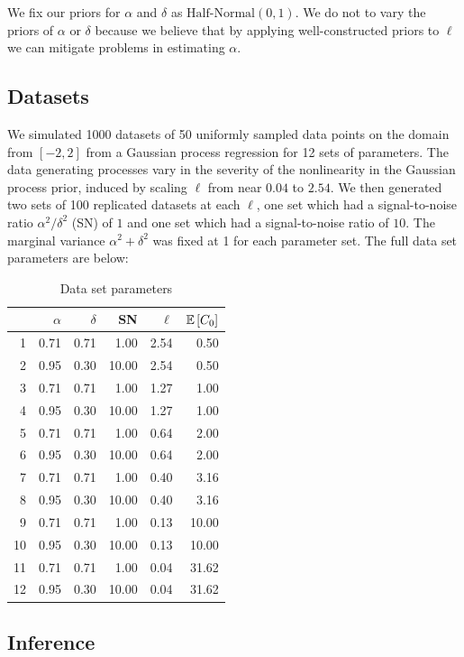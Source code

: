 \documentclass{article}
\newcommand{\Exp}[1]{\ensuremath{\mathbb{E} \lb #1 \rb}}
\newcommand{\lb}{\ensuremath{\left[}}
\newcommand{\rb}{\ensuremath{\right]}}
\begin{document}
We fix our priors for $\alpha$ and $\delta$ as $\text{Half-Normal}(0, 1)$. We
do not to vary the priors of $\alpha$ or $\delta$ because we believe that by
applying well-constructed priors to $\ell$ we can mitigate problems in
estimating $\alpha$. 

\subsection{Datasets}

We simulated 1000 datasets of 50 uniformly sampled data points on the domain
from $[-2, 2]$ from a Gaussian process regression for 12 sets of parameters.
The data generating processes vary in the severity of the nonlinearity in the
Gaussian process prior, induced by scaling $\ell$ from near $0.04$ to $2.54$.
We then generated two sets of 100 replicated datasets at each $\ell$, one set
which had a signal-to-noise ratio $\alpha ^ 2/ \delta ^ 2$ (SN) of $1$ and one
set which had a signal-to-noise ratio of $10$. The marginal variance $\alpha ^
2 + \delta ^ 2$ was fixed at 1 for each parameter set. The full data set
parameters are below:
\begin{table}[ht]
\centering
\caption{Data set parameters}
\begin{tabular}{rrrrrr}
  \hline
  & $\alpha$ & $\delta$ & SN & $\ell$ & $\Exp{C_0}$ \\ 
  \hline
1 & 0.71 & 0.71 & 1.00 & 2.54 & 0.50 \\ 
  2 & 0.95 & 0.30 & 10.00 & 2.54 & 0.50 \\ 
  3 & 0.71 & 0.71 & 1.00 & 1.27 & 1.00 \\ 
  4 & 0.95 & 0.30 & 10.00 & 1.27 & 1.00 \\ 
  5 & 0.71 & 0.71 & 1.00 & 0.64 & 2.00 \\ 
  6 & 0.95 & 0.30 & 10.00 & 0.64 & 2.00 \\ 
  7 & 0.71 & 0.71 & 1.00 & 0.40 & 3.16 \\ 
  8 & 0.95 & 0.30 & 10.00 & 0.40 & 3.16 \\ 
  9 & 0.71 & 0.71 & 1.00 & 0.13 & 10.00 \\ 
  10 & 0.95 & 0.30 & 10.00 & 0.13 & 10.00 \\ 
  11 & 0.71 & 0.71 & 1.00 & 0.04 & 31.62 \\ 
  12 & 0.95 & 0.30 & 10.00 & 0.04 & 31.62 \\ 
   \hline
\end{tabular}
\end{table}
\subsection{Inference}
\end{document}
